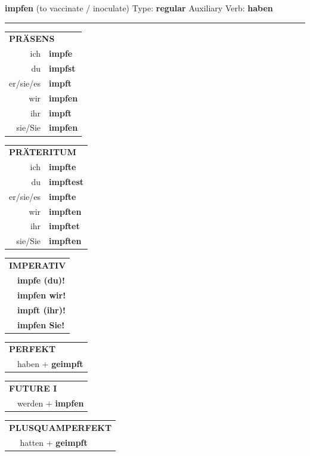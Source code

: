 \documentclass[10pt,a4paper]{revtex4-2}
\begin{document}
\begin{verbbox}
{\Large \bf impfen} (to vaccinate / inoculate) \hfill Type: \textbf{regular} \hfill Auxiliary Verb: \textbf{haben}

\vspace{5pt}
\hrule
\vspace{5pt}

\begin{tabular}{rl}
\multicolumn{2}{l}{\textbf{PRÄSENS}}\\
ich & \textbf{impfe}\\
du & \textbf{impfst}\\
er/sie/es & \textbf{impft}\\
wir & \textbf{impfen}\\
ihr & \textbf{impft}\\
sie/Sie & \textbf{impfen}\\
\end{tabular}
\hfill
\begin{tabular}{rl}
\multicolumn{2}{l}{\textbf{PRÄTERITUM}}\\
ich & \textbf{impfte}\\
du & \textbf{impftest}\\
er/sie/es & \textbf{impfte}\\
wir & \textbf{impften}\\
ihr & \textbf{impftet}\\
sie/Sie & \textbf{impften}\\
\end{tabular}
\hfill
\begin{tabular}{rl}
\multicolumn{2}{l}{\textbf{IMPERATIV}}\\
& \textbf{impfe (du)!}\\
& \textbf{impfen wir!}\\
& \textbf{impft (ihr)!}\\
& \textbf{impfen Sie!}\\
\end{tabular}

\vspace{10pt}

\begin{tabular}{rl}
\multicolumn{2}{l}{\textbf{PERFEKT}}\\
& haben + \textbf{geimpft}\\
\end{tabular}
\hfill
\begin{tabular}{rl}
\multicolumn{2}{l}{\textbf{FUTURE I}}\\
& werden + \textbf{impfen}\\
\end{tabular}
\hfill
\begin{tabular}{rl}
\multicolumn{2}{l}{\textbf{PLUSQUAMPERFEKT}}\\
& hatten + \textbf{geimpft}\\
\end{tabular}


\end{verbbox}
\end{document}
